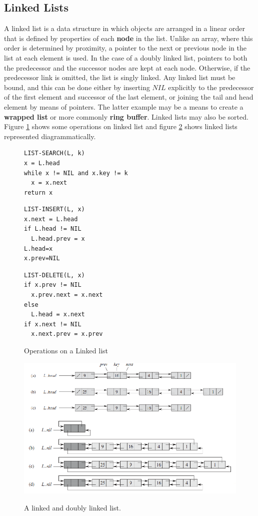 \documentclass[10pt,a4paper]{article}
\begin{document}
\subsection{Linked Lists}
A linked list is a data structure in which objects are arranged in a linear order that is defined by properties of each {\bf node} in the list. Unlike an array, where this order is determined by proximity, a pointer to the next or previous node in the list at each element is used. In the case of a doubly linked list, pointers to both the predecessor and the successor nodes are kept at each node. Otherwise, if the predecessor link is omitted, the list is singly linked. Any linked list must be bound, and this can be done either by inserting $NIL$ explicitly to the predecessor of the first element and successor of the last element, or joining the tail and head element by means of pointers. The latter example may be a means to create a {\bf wrapped list} or more commonly {\bf ring buffer}. Linked lists may also be sorted. Figure \ref{linkedlisting} shows some operations on linked list and figure \ref{linkedlist} shows linked lists represented diagrammatically.
\begin{figure}
\caption{Operations on a Linked list}
\begin{center}
\begin{lstlisting}
LIST-SEARCH(L, k)
x = L.head
while x != NIL and x.key != k
  x = x.next
return x
\end{lstlisting}
\begin{lstlisting}
LIST-INSERT(L, x)
x.next = L.head
if L.head != NIL
  L.head.prev = x
L.head=x
x.prev=NIL
\end{lstlisting}
\begin{lstlisting}
LIST-DELETE(L, x)
if x.prev != NIL
  x.prev.next = x.next
else
  L.head = x.next
if x.next != NIL
  x.next.prev = x.prev
\end{lstlisting}
\label{linkedlisting}
\end{center}
\end{figure}
\begin{figure}
\caption{A linked and doubly linked list.\cite{INTROALG}}
\begin{center}
\includegraphics[scale=0.43]{../images/linkedlist.png}
\label{linkedlist}
\end{center}
\end{figure}
\end{document}
